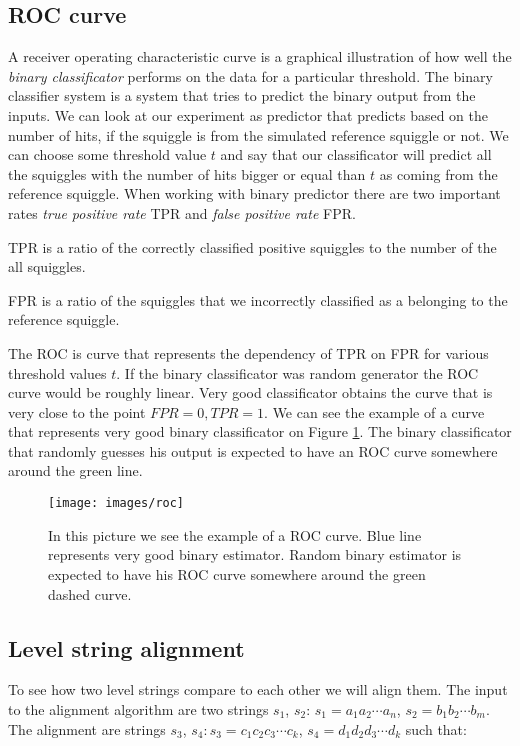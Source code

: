 \subsection{ROC curve}

A receiver operating characteristic curve is a graphical illustration of how well
the \textit{binary classificator} performs on the data for a particular threshold. The binary
classifier system is a system that tries to predict the binary output from the inputs.
We can look at our experiment as predictor that predicts based on the number of hits, if the squiggle is from the
simulated reference squiggle or not. We can choose some threshold value $t$ and say that
our classificator will predict all the squiggles with the number of hits bigger or equal
than $t$ as coming from the reference squiggle. When working with binary predictor there
are two important rates \textit{true positive rate} TPR and \textit{false positive rate} FPR. 

TPR is a ratio of the correctly classified positive squiggles to the number of the all squiggles.

FPR is a ratio of the squiggles that we incorrectly classified as a belonging to the reference squiggle.

The ROC is curve that represents the dependency of TPR on FPR for various threshold values $t$.
If the binary classificator was random generator the ROC curve would be roughly
linear. Very good classificator obtains the curve that is very close to the point
$FPR = 0, TPR = 1$. We can see the example of a curve that represents very good
binary classificator on Figure \ref{obr:roc}. The binary classificator that randomly
guesses his output is expected to have an ROC curve somewhere around the green line.

\begin{figure}
\centerline{\texttt{[image: images/roc]}}
\caption[TODO]{In this picture we see the example of a ROC curve. Blue line represents very good
binary estimator. Random binary estimator is expected to have his ROC curve somewhere around the green dashed curve.}
\label{obr:roc}
\end{figure}

\subsection{Level string alignment}
\label{section:alignment}

To see how two level strings compare to each other we will align them. The input
to the alignment algorithm are two strings $s_1$, $s_2$:
$s_1=a_1a_2\cdots a_n$, $s_2=b_1b_2\cdots b_m$. The alignment are strings
$s_3$, $s_4: s_3 = c_1c_2c_3\cdots c_k$, $s_4 = d_1d_2d_3\cdots d_k$ such that:

